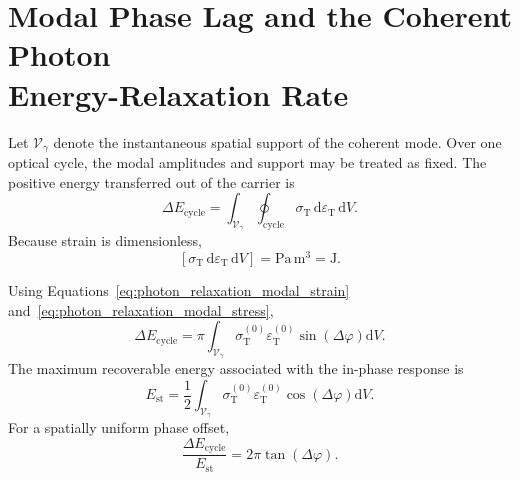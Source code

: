 \section[Modal Phase Lag and the Coherent Photon Energy-Relaxation Rate]
{Modal Phase Lag and the Coherent Photon\\Energy-Relaxation Rate}
\label{sec:photon_relaxation_phase_lag_rate}

Let \(\mathcal{V}_{\gamma}\) denote the instantaneous spatial support of the
coherent mode. Over one optical cycle, the modal amplitudes and support may be
treated as fixed. The positive energy transferred out of the carrier is
\begin{equation}
    \Delta E_{\mathrm{cycle}}
    =
    \int_{\mathcal{V}_{\gamma}}
    \oint_{\mathrm{cycle}}
    \sigma_{\mathrm T}\,
    \mathrm{d}\varepsilon_{\mathrm T}\,
    \mathrm{d}V.
    \label{eq:photon_relaxation_cycle_work_definition}
\end{equation}
Because strain is dimensionless,
\[
    \left[
        \sigma_{\mathrm T}\,
        \mathrm{d}\varepsilon_{\mathrm T}\,
        \mathrm{d}V
    \right]
    =
    \mathrm{Pa\,m^3}
    =
    \mathrm J.
\]

Using Equations~\eqref{eq:photon_relaxation_modal_strain}
and~\eqref{eq:photon_relaxation_modal_stress},
\begin{equation}
    \Delta E_{\mathrm{cycle}}
    =
    \pi
    \int_{\mathcal{V}_{\gamma}}
    \sigma_{\mathrm T}^{(0)}
    \varepsilon_{\mathrm T}^{(0)}
    \sin
    \left(
        \Delta\varphi
    \right)
    \mathrm{d}V.
    \label{eq:photon_relaxation_cycle_work}
\end{equation}
The maximum recoverable energy associated with the in-phase response is
\begin{equation}
    E_{\mathrm{st}}
    =
    \frac{1}{2}
    \int_{\mathcal{V}_{\gamma}}
    \sigma_{\mathrm T}^{(0)}
    \varepsilon_{\mathrm T}^{(0)}
    \cos
    \left(
        \Delta\varphi
    \right)
    \mathrm{d}V.
    \label{eq:photon_relaxation_stored_modal_energy}
\end{equation}
For a spatially uniform phase offset,
\begin{equation}
    \frac{
        \Delta E_{\mathrm{cycle}}
    }{
        E_{\mathrm{st}}
    }
    =
    2\pi
    \tan
    \left(
        \Delta\varphi
    \right).
    \label{eq:photon_relaxation_fractional_cycle_loss}
\end{equation}

